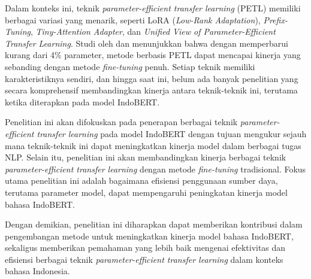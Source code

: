 Dalam konteks ini, teknik \textit{parameter-efficient transfer learning} (PETL) memiliki berbagai variasi yang menarik, seperti LoRA (\textit{Low-Rank Adaptation}), \textit{Prefix-Tuning}, \textit{Tiny-Attention Adapter}, dan \textit{Unified View of Parameter-Efficient Transfer Learning}. Studi oleh \citeauthor{parameter} dan \citeauthor{uvpl} menunjukkan bahwa dengan memperbarui kurang dari 4\% parameter, metode berbasis PETL dapat mencapai kinerja yang sebanding dengan metode \textit{fine-tuning} penuh. Setiap teknik memiliki karakteristiknya sendiri, dan hingga saat ini, belum ada banyak penelitian yang secara komprehensif membandingkan kinerja antara teknik-teknik ini, terutama ketika diterapkan pada model IndoBERT. 

Penelitian ini akan difokuskan pada penerapan berbagai teknik \textit{parameter-efficient transfer learning} pada model IndoBERT dengan tujuan mengukur sejauh mana teknik-teknik ini dapat meningkatkan kinerja model dalam berbagai tugas NLP. Selain itu, penelitian ini akan membandingkan kinerja berbagai teknik \textit{parameter-efficient transfer learning} dengan metode \textit{fine-tuning} tradisional. Fokus utama penelitian ini adalah bagaimana efisiensi penggunaan sumber daya, terutama parameter model, dapat mempengaruhi peningkatan kinerja model bahasa IndoBERT.

Dengan demikian, penelitian ini diharapkan dapat memberikan kontribusi dalam pengembangan metode untuk meningkatkan kinerja model bahasa IndoBERT, sekaligus memberikan pemahaman yang lebih baik mengenai efektivitas dan efisiensi berbagai teknik \textit{parameter-efficient transfer learning} dalam konteks bahasa Indonesia.